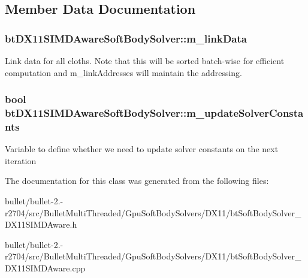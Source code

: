 \subsection{Member Data Documentation}
\hypertarget{classbt_d_x11_s_i_m_d_aware_soft_body_solver_a49c86a3bbaf2e70877057fa0d2059848}{
\subsubsection[{m\+\_\+link\+Data}]{ bt\+D\+X11\+S\+I\+M\+D\+Aware\+Soft\+Body\+Solver\+::m\+\_\+link\+Data\hspace{0.3cm}{\ttfamily [protected]}}}\label{classbt_d_x11_s_i_m_d_aware_soft_body_solver_a49c86a3bbaf2e70877057fa0d2059848}
Link data for all cloths. Note that this will be sorted batch-\/wise for efficient computation and m\+\_\+link\+Addresses will maintain the addressing. \hypertarget{classbt_d_x11_s_i_m_d_aware_soft_body_solver_af027eb9f28bcc9069a003dd7867d0e0c}{
\subsubsection[{m\+\_\+update\+Solver\+Constants}]{\setlength{\rightskip}{0pt plus 5cm}bool bt\+D\+X11\+S\+I\+M\+D\+Aware\+Soft\+Body\+Solver\+::m\+\_\+update\+Solver\+Constants\hspace{0.3cm}{\ttfamily [protected]}}}\label{classbt_d_x11_s_i_m_d_aware_soft_body_solver_af027eb9f28bcc9069a003dd7867d0e0c}
Variable to define whether we need to update solver constants on the next iteration 

The documentation for this class was generated from the following files\+:\begin{DoxyCompactItemize}
\item 
bullet/bullet-\/2.-\/r2704/src/\+Bullet\+Multi\+Threaded/\+Gpu\+Soft\+Body\+Solvers/\+D\+X11/bt\+Soft\+Body\+Solver\+\_\+\+D\+X11\+S\+I\+M\+D\+Aware.\+h\item 
bullet/bullet-\/2.-\/r2704/src/\+Bullet\+Multi\+Threaded/\+Gpu\+Soft\+Body\+Solvers/\+D\+X11/bt\+Soft\+Body\+Solver\+\_\+\+D\+X11\+S\+I\+M\+D\+Aware.\+cpp\end{DoxyCompactItemize}
